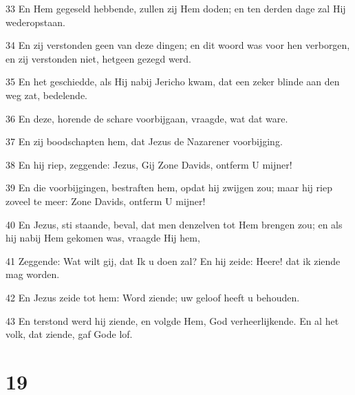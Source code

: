 \par 33 En Hem gegeseld hebbende, zullen zij Hem doden; en ten derden dage zal Hij wederopstaan.
\par 34 En zij verstonden geen van deze dingen; en dit woord was voor hen verborgen, en zij verstonden niet, hetgeen gezegd werd.
\par 35 En het geschiedde, als Hij nabij Jericho kwam, dat een zeker blinde aan den weg zat, bedelende.
\par 36 En deze, horende de schare voorbijgaan, vraagde, wat dat ware.
\par 37 En zij boodschapten hem, dat Jezus de Nazarener voorbijging.
\par 38 En hij riep, zeggende: Jezus, Gij Zone Davids, ontferm U mijner!
\par 39 En die voorbijgingen, bestraften hem, opdat hij zwijgen zou; maar hij riep zoveel te meer: Zone Davids, ontferm U mijner!
\par 40 En Jezus, sti staande, beval, dat men denzelven tot Hem brengen zou; en als hij nabij Hem gekomen was, vraagde Hij hem,
\par 41 Zeggende: Wat wilt gij, dat Ik u doen zal? En hij zeide: Heere! dat ik ziende mag worden.
\par 42 En Jezus zeide tot hem: Word ziende; uw geloof heeft u behouden.
\par 43 En terstond werd hij ziende, en volgde Hem, God verheerlijkende. En al het volk, dat ziende, gaf Gode lof.

\chapter{19}

